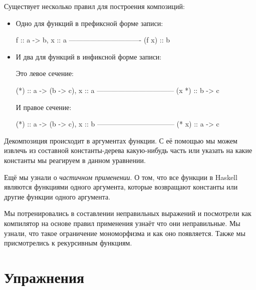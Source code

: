 Существует несколько правил для построения композиций:

\begin{itemize}

\item Одно для функций в префиксной форме записи:

\begin{code}
                    f :: a -> b,           x :: a 
                    -------------------------------
                              (f x) :: b
\end{code}

\item И два для функций в инфиксной форме записи:

Это левое сечение:

\begin{code}
                    (*) :: a -> (b -> c),     x :: a 
                    ---------------------------------
                             (x *) :: b -> c
\end{code}

И правое сечение:

\begin{code}
                    (*) :: a -> (b -> c),     x :: b 
                    ---------------------------------
                                (* x) :: a -> c
\end{code}

\end{itemize}


Декомпозиция происходит в аргументах функции. 
С её помощью мы можем извлечь из составной константы-дерева
какую-нибудь часть или указать на какие константы мы реагируем 
в данном уравнении. 

Ещё мы узнали о \emph{частичном применении}. О том, что все
функции в Haskell являются функциями одного аргумента,
которые возвращают константы или другие функции одного аргумента. 

Мы потренировались в составлении неправильных выражений
и посмотрели как компилятор на основе правил применения 
узнаёт что они неправильные. Мы узнали, что такое
ограничение мономорфизма и как оно появляется.
Также мы присмотрелись к рекурсивным функциям. 


\section{Упражнения}

